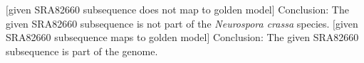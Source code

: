 \documentclass[letter,12pt]{article}
\begin{document}
\begin{codebox}
\label{lst:SRA82660notNeurosporacrassa}
\zi {}
\li	\If $[$given SRA82660 subsequence does not map to golden model$]$
	\Then
\li		Conclusion: The given SRA82660 subsequence is not part of the {\it Neurospora crassa} species.
\li	\ElseIf $[$given SRA82660 subsequence maps to golden model$]$
	\Then
\li		Conclusion: The given SRA82660 subsequence is part of the genome.
\li	
	\End
\li	\Return
\end{codebox}


















%
%
%

{\linespread{1}

%

}
\end{document}
